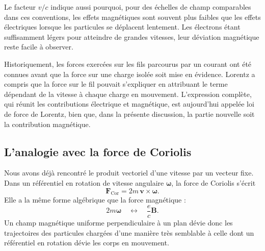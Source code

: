 Le facteur \(v/c\) indique aussi pourquoi, pour des échelles de champ comparables dans ces conventions, les effets magnétiques sont souvent plus faibles que les effets électriques lorsque les particules se déplacent lentement. Les électrons étant suffisamment légers pour atteindre de grandes vitesses, leur déviation magnétique reste facile à observer.

Historiquement, les forces exercées sur les fils parcourus par un courant ont été connues avant que la force sur une charge isolée soit mise en évidence. Lorentz a compris que la force sur le fil pouvait s’expliquer en attribuant le terme dépendant de la vitesse à chaque charge en mouvement. L’expression complète, qui réunit les contributions électrique et magnétique, est aujourd’hui appelée loi de force de Lorentz, bien que, dans la présente discussion, la partie nouvelle soit la contribution magnétique.

\begin{classroomqa}
\end{classroomqa}

\subsection{L’analogie avec la force de Coriolis}

Nous avons déjà rencontré le produit vectoriel d’une vitesse par un vecteur fixe. Dans un référentiel en rotation de vitesse angulaire \(\boldsymbol\omega\), la force de Coriolis s’écrit
\begin{equation}
  \mathbf F_{\mathrm{Cor}}
  =
  2m\,\mathbf v\times\boldsymbol\omega.
\end{equation}
Elle a la même forme algébrique que la force magnétique :
\begin{equation}
  2m\boldsymbol\omega
  \quad\longleftrightarrow\quad
  \frac{e}{c}\mathbf B.
\end{equation}
Un champ magnétique uniforme perpendiculaire à un plan dévie donc les trajectoires des particules chargées d’une manière très semblable à celle dont un référentiel en rotation dévie les corps en mouvement.

